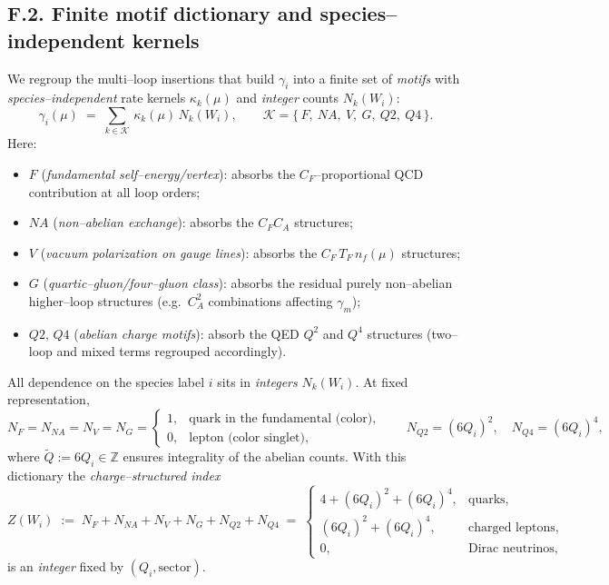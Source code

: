 \documentclass[epjc3]{svjour3}
\begin{document}
\subsection*{F.2. Finite motif dictionary and species--independent kernels}
We regroup the multi--loop insertions that build $\gamma_i$ into a finite set of \emph{motifs} with \emph{species--independent} rate kernels $\kappa_k(\mu)$ and \emph{integer} counts $N_k(W_i)$:
\begin{equation}
  \gamma_i(\mu)\;=\;\sum_{k\in\mathcal K}\,\kappa_k(\mu)\,N_k(W_i),
  \qquad
  \mathcal K=\{\,F,\ NA,\ V,\ G,\ Q2,\ Q4\,\}.
  \label{eq:F.motif.regroup}
\end{equation}
Here:
\begin{itemize}
  \item $F$ (\emph{fundamental self--energy/vertex}): absorbs the $C_F$--proportional QCD contribution at all loop orders;
  \item $NA$ (\emph{non--abelian exchange}): absorbs the $C_FC_A$ structures;
  \item $V$ (\emph{vacuum polarization on gauge lines}): absorbs the $C_F\,T_F\,n_f(\mu)$ structures;
  \item $G$ (\emph{quartic--gluon/four--gluon class}): absorbs the residual purely non--abelian higher--loop structures (e.g.\ $C_A^2$ combinations affecting $\gamma_m$);
  \item $Q2$, $Q4$ (\emph{abelian charge motifs}): absorb the QED $Q^2$ and $Q^4$ structures (two--loop and mixed terms regrouped accordingly).
\end{itemize}
All dependence on the species label $i$ sits in \emph{integers} $N_k(W_i)$.  At fixed representation,
\[
  N_F=N_{NA}=N_V=N_G=
  \begin{cases}
    1,& \text{quark in the fundamental (color)},\\
    0,& \text{lepton (color singlet)},
  \end{cases}
\qquad
N_{Q2}=(6Q_i)^2,\quad N_{Q4}=(6Q_i)^4,
\]
where $\tilde Q:=6Q_i\in\mathbb Z$ ensures integrality of the abelian counts.  With this dictionary the \emph{charge--structured index}
\begin{equation}
  Z(W_i)\;:=\;N_F+N_{NA}+N_V+N_G+N_{Q2}+N_{Q4}
  \;=\;
  \begin{cases}
    4+(6Q_i)^2+(6Q_i)^4,& \text{quarks},\\[2pt]
    (6Q_i)^2+(6Q_i)^4,& \text{charged leptons},\\[2pt]
    0,& \text{Dirac neutrinos},
  \end{cases}
  \label{eq:F.Z.def}
\end{equation}
is an \emph{integer} fixed by $(Q_i,\text{sector})$.
\end{document}
